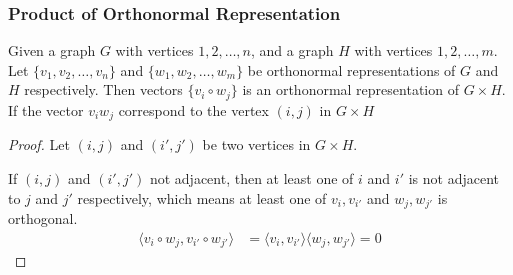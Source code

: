      \begin{frame}
            \frametitle{Product of Orthonormal Representation}

            \begin{lemma}
                  Given a graph $ G $ with vertices $ 1,2,\dots,n $, and a graph $ H $ with vertices $ 1,2,\dots,m $.
                  Let $ \{v_1, v_2, \dots, v_n\} $ and $ \{w_1, w_2, \dots, w_m\} $ be orthonormal representations of $ G $ and $ H $ respectively.
                  Then vectors $\{ v_{i}\circ w_{j} \}$ is an orthonormal representation of $ G \times H $.
                  If the vector $v_{i}w_{j}$ correspond to the vertex $(i,j)$ in $G \times H$
            \end{lemma}

            \pause

            \begin{proof}
                  Let $(i,j)$ and $(i',j')$ be two vertices in $ G \times H $.

                  If $ (i,j) $ and $ (i',j') $ not adjacent, then at least one of $ i $ and $ i' $ is not adjacent to $ j $ and $ j' $ respectively, which means at least one of $ v_i , v_{i'} $ and $ w_j , w_{j'} $ is orthogonal.
                  \begin{align}
                        \langle v_i \circ w_j, v_{i'} \circ w_{j'} \rangle &= \langle v_i, v_{i'} \rangle \langle w_j, w_{j'} \rangle = 0 
                  \end{align}
            \end{proof}
      \end{frame}
